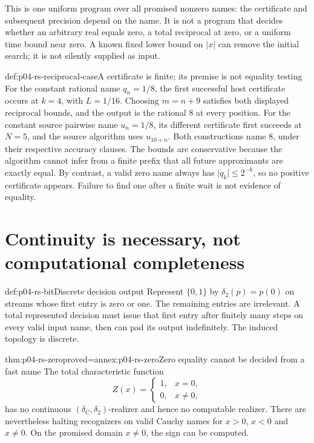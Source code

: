 This is one uniform program over all promised nonzero names:
the certificate and subsequent precision depend on the name.
It is not a program that decides whether an arbitrary real
equals zero, a total reciprocal at zero, or a uniform time bound
near zero. A known fixed lower bound on \(\lvert x\rvert\) can
remove the initial search; it is not silently supplied as input.

\begin{hbexample}{def:p04-rs-reciprocal-case}{A certificate is finite; its premise is not equality testing}
For the constant rational name \(q_n=1/8\), the first successful
host certificate occurs at \(k=4\), with \(L=1/16\).
Choosing \(m=n+9\) satisfies both displayed reciprocal bounds,
and the output is the rational \(8\) at every position.
For the constant source pairwise name \(u_n=1/8\), its different
certificate first succeeds at \(N=5\), and the source algorithm
uses \(u_{10+n}\). Both constructions name \(8\), under their
respective accuracy clauses.
The bounds are conservative because the algorithm cannot infer
from a finite prefix that all future approximants are exactly
equal. By contrast, a valid zero name always has
\(\lvert q_k\rvert\leq2^{-k}\), so no positive certificate appears.
Failure to find one after a finite wait is not evidence of equality.
\end{hbexample}

\section{Continuity is necessary, not computational completeness}
\label{sec:p04-rs-obstructions}

\begin{hbdefinition}{def:p04-rs-bit}{Discrete decision output}
Represent \(\{0,1\}\) by
\(\delta_2(p)=p(0)\) on streams whose first entry is zero or one.
The remaining entries are irrelevant. A total represented decision
must issue that first entry after finitely many steps on every
valid input name, then can pad its output indefinitely.
The induced topology is discrete.
\end{hbdefinition}

\begin{hbtheorem}{thm:p04-rs-zero}{proved=annex:p04-rs-zero}{Zero equality cannot be decided from a fast name}
The total characteristic function
\[
 Z(x)=
 \begin{cases}1,&x=0,\\0,&x\ne0,\end{cases}
\]
has no continuous \((\delta_{\mathrm C},\delta_2)\)-realizer
and hence no computable realizer.
There are nevertheless halting recognizers on valid Cauchy names
for \(x>0\), \(x<0\) and \(x\ne0\).
On the promised domain \(x\ne0\), the sign can be computed.
\end{hbtheorem}

